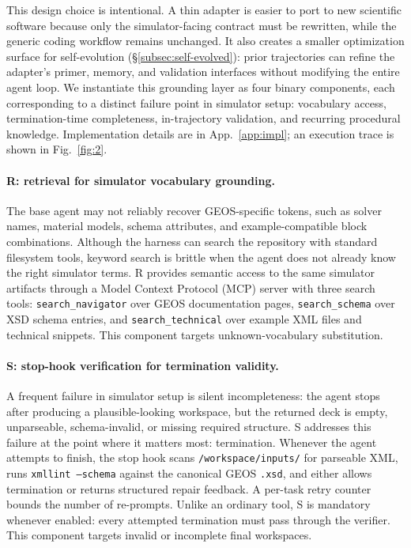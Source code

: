\documentclass{article}
\begin{document}
This design choice is intentional. 
A thin adapter is easier to port to new scientific software because only the simulator-facing contract must be rewritten, while the generic coding workflow remains unchanged. 
It also creates a smaller optimization surface for self-evolution (\S\ref{subsec:self-evolved}): prior trajectories can refine the adapter's primer, memory, and validation interfaces without modifying the entire agent loop. 
We instantiate this grounding layer as four binary components, each corresponding to a distinct failure point in simulator setup: vocabulary access, termination-time completeness, in-trajectory validation, and recurring procedural knowledge. 
Implementation details are in App.~\ref{app:impl}; an execution trace is shown in Fig.~\ref{fig:2}.

\paragraph{R: retrieval for simulator vocabulary grounding.}
The base agent may not reliably recover GEOS-specific tokens, such as solver names, material models, schema attributes, and example-compatible block combinations. 
Although the harness can search the repository with standard filesystem tools, keyword search is brittle when the agent does not already know the right simulator terms. 
R provides semantic access to the same simulator artifacts through a Model Context Protocol (MCP) server with three search tools: \texttt{search\_navigator} over GEOS documentation pages, \texttt{search\_schema} over XSD schema entries, and \texttt{search\_technical} over example XML files and technical snippets. 
This component targets unknown-vocabulary substitution.

\paragraph{S: stop-hook verification for termination validity.}
A frequent failure in simulator setup is silent incompleteness: the agent stops after producing a plausible-looking workspace, but the returned deck is empty, unparseable, schema-invalid, or missing required structure. 
S addresses this failure at the point where it matters most: termination. 
Whenever the agent attempts to finish, the stop hook scans \texttt{/workspace/inputs/} for parseable XML, runs \texttt{xmllint --schema} against the canonical GEOS \texttt{.xsd}, and either allows termination or returns structured repair feedback. 
A per-task retry counter bounds the number of re-prompts. 
Unlike an ordinary tool, S is mandatory whenever enabled: every attempted termination must pass through the verifier. 
This component targets invalid or incomplete final workspaces.
\end{document}
